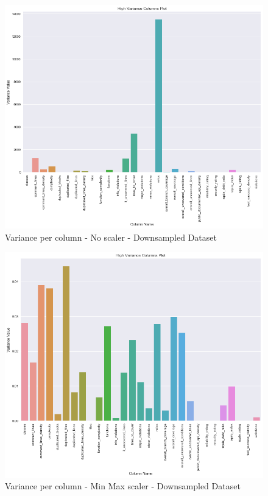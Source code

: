 \begin{figure}[!h]
    \centering
    \includegraphics[scale=0.6]{Figures/Variance/downsample/Comparison_of_variance_per_column_for_unmodified_downsampled_dataset.png}
    \caption{Variance per column - No scaler - Downsampled Dataset}
    \label{fig:scalers:variance-unscaled-downsample}
\end{figure}

\begin{figure}[!h]
    \centering
    \includegraphics[scale=0.6]{Figures/Variance/downsample/Comparison_of_variance_per_column_for_min-max_downsampled_dataset.png}
    \caption{Variance per column - Min Max scaler - Downsampled Dataset}
    \label{fig:scalers:variance-min-max-downsample}
\end{figure}

